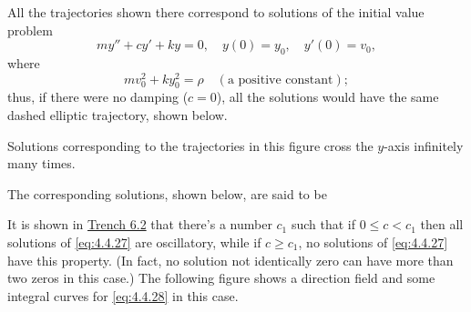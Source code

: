 \documentclass{ximera}
\begin{document}
 
 
All the trajectories shown there correspond to
solutions of the initial value problem
$$
my''+cy'+ky=0,\quad y(0)=y_0,\quad y'(0)=v_0,
$$
where
$$
mv_0^2+ky_0^2=\rho\quad (\mbox{a positive constant});
$$
thus, if there were no damping ($c=0$),  all the solutions would
have the same dashed elliptic trajectory, shown below.
 
 
Solutions corresponding to the trajectories in
this figure cross the $y$-axis infinitely many times.
 
 
 
The corresponding solutions, shown below, are said to be 
 
 
 
It is shown in \href{https://ximera.osu.edu/ode/main/springProblemsII/springProblemsII}{Trench 6.2} that there's a number $c_1$ such that if $0\leq
c<c_1$ then  all solutions of \eqref{eq:4.4.27} are oscillatory, while if
$c\geq c_1$,  no solutions of \eqref{eq:4.4.27} have this property. (In
fact, no solution not identically zero can have more than two zeros in
this case.) The following figure shows a direction field and
some integral curves for \eqref{eq:4.4.28} in this case.
 
 
\end{document}
